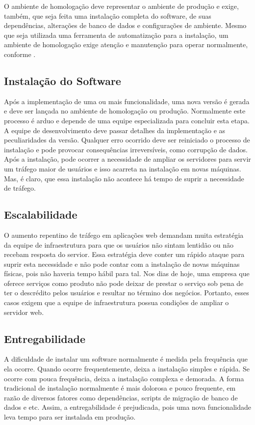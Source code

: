 \documentclass[
	12pt,				%
	openright,			%
	oneside,			%
	a4paper,			%
	chapter=TITLE,		%
	section=TITLE,		%
	english,			%
	french,				%
	spanish,			%
	brazil				%
	]{abntex2}
\begin{document}
O ambiente de homologação deve representar o ambiente de produção e exige, também, que seja feita uma instalação completa do software, de suas dependências, alterações de banco de dados e configurações de ambiente. Mesmo que seja utilizada uma ferramenta de automatização para a instalação, um ambiente de homologação exige atenção e manutenção para operar normalmente, conforme .

\subsection{Instalação do Software}

Após a implementação de uma ou mais funcionalidade, uma nova versão é gerada e deve ser lançada no ambiente de homologação ou produção. Normalmente este processo é arduo e depende de uma equipe especializada para concluir esta etapa. A equipe de desenvolvimento deve passar detalhes da implementação e as peculiaridades da versão. Qualquer erro ocorrido deve ser reiniciado o processo de instalação e pode provocar consequências irreversíveis, como corrupção de dados. Após a instalação, pode ocorrer a necessidade de ampliar os servidores para servir um tráfego maior de usuários e isso acarreta na instalação em novas máquinas. Mas, é claro, que essa instalação não acontece há tempo de suprir a necessidade de tráfego.

\subsection{Escalabilidade}

O aumento repentino de tráfego em aplicações web demandam muita estratégia da equipe de infraestrutura para que os usuários não sintam lentidão ou não recebam resposta do servior. Essa estratégia deve conter um rápido ataque para suprir esta necessidade e não pode contar com a instalação de novas máquinas físicas, pois não haveria tempo hábil para tal. Nos dias de hoje, uma empresa que oferece serviços como produto não pode deixar de prestar o serviço sob pena de ter o descrédito pelos usuários e resultar no término dos negócios. Portanto, esses casos exigem que a equipe de infraestrutura possua condições de ampliar o servidor web.

\subsection{Entregabilidade}

A dificuldade de instalar um software normalmente é medida pela frequência que ela ocorre. Quando ocorre frequentemente, deixa a instalação simples e rápida. Se ocorre com pouca frequência, deixa a instalação complexa e demorada. A forma tradicional de instalação normalmente é mais dolorosa e pouco frequente, em razão de diversos fatores como dependências, scripts de migração de banco de dados e etc. Assim, a entregabilidade é prejudicada, pois uma nova funcionalidade leva tempo para ser instalada em produção.
\end{document}
